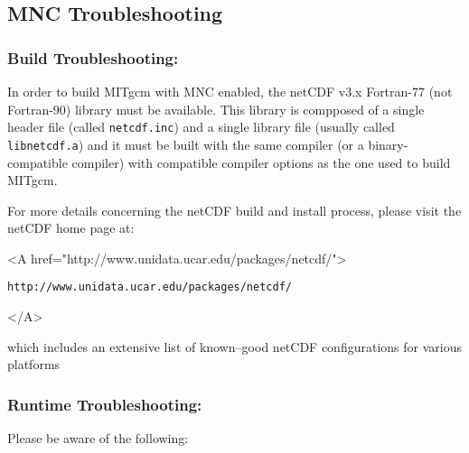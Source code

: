 \subsection{MNC Troubleshooting}

\subsubsection{Build Troubleshooting:}

In order to build MITgcm with MNC enabled, the netCDF v3.x Fortran-77
(not Fortran-90) library must be available.  This library is compposed
of a single header file (called \texttt{netcdf.inc}) and a single
library file (usually called \texttt{libnetcdf.a}) and it must be
built with the same compiler (or a binary-compatible compiler) with
compatible compiler options as the one used to build MITgcm.

For more details concerning the netCDF build and install process,
please visit the netCDF home page at:
\begin{rawhtml} <A href="http://www.unidata.ucar.edu/packages/netcdf/"> \end{rawhtml}
\begin{verbatim}
http://www.unidata.ucar.edu/packages/netcdf/
\end{verbatim}
\begin{rawhtml} </A> \end{rawhtml} 
which includes an extensive list of known--good netCDF configurations
for various platforms

\subsubsection{Runtime Troubleshooting:}

Please be aware of the following:

